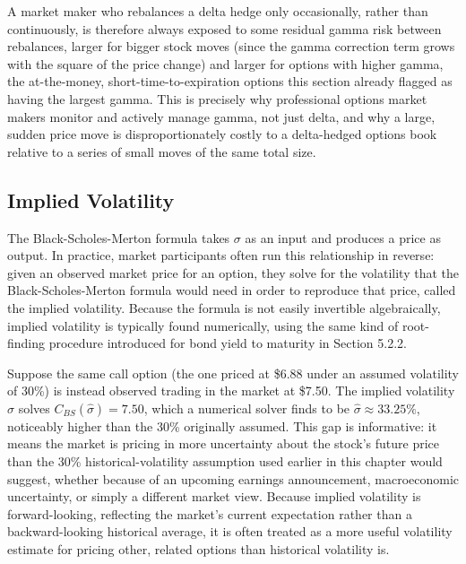 \documentclass[../ai_in_finance]{subfiles}
\begin{document}
A market maker who rebalances a delta hedge only occasionally, rather than continuously, is therefore always exposed to some residual gamma risk between rebalances, larger for bigger stock moves (since the gamma correction term grows with the square of the price change) and larger for options with higher gamma, the at-the-money, short-time-to-expiration options this section already flagged as having the largest gamma. This is precisely why professional options market makers monitor and actively manage gamma, not just delta, and why a large, sudden price move is disproportionately costly to a delta-hedged options book relative to a series of small moves of the same total size.

\subsection{Implied Volatility}

The Black-Scholes-Merton formula takes $\sigma$ as an input and produces a price as output. In practice, market participants often run this relationship in reverse: given an observed market price for an option, they solve for the volatility that the Black-Scholes-Merton formula would need in order to reproduce that price, called the implied volatility. Because the formula is not easily invertible algebraically, implied volatility is typically found numerically, using the same kind of root-finding procedure introduced for bond yield to maturity in Section 5.2.2.

Suppose the same call option (the one priced at \$6.88 under an assumed volatility of 30\%) is instead observed trading in the market at \$7.50.
The implied volatility $\hat\sigma$ solves $C_{BS}(\hat\sigma) = 7.50$, which a numerical solver finds to be $\hat\sigma \approx 33.25\%$, noticeably
higher than the 30\% originally assumed. This gap is informative: it means the market is pricing in more uncertainty about the stock's future price
than the 30\% historical-volatility assumption used earlier in this chapter would suggest, whether because of an upcoming earnings announcement,
macroeconomic uncertainty, or simply a different market view. Because implied volatility is forward-looking, reflecting the market's current
expectation rather than a backward-looking historical average, it is often treated as a more useful volatility estimate for pricing other,
related options than historical volatility is.
\end{document}
